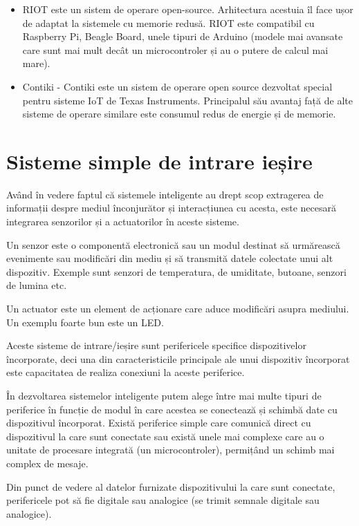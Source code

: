 \begin{itemize}
	\item RIOT este un sistem de operare open-source. Arhitectura acestuia îl face ușor de
		adaptat la sistemele cu memorie redusă. RIOT este compatibil cu
		Raspberry Pi, Beagle Board, unele tipuri de Arduino (modele mai
		avansate care sunt mai mult decât un microcontroler și au o
		putere de calcul mai mare).
	\item Contiki - Contiki este un sistem de operare open source dezvoltat
		special pentru sisteme IoT de Texas Instruments. Principalul său
		avantaj față de alte sisteme de operare similare este consumul
		redus de energie și de memorie.
\end{itemize}

\section{Sisteme simple de intrare ieșire}
\label{sec:embed:io}

Având în vedere faptul că sistemele inteligente au drept scop extragerea de
informații despre mediul înconjurător și interacțiunea cu acesta, este necesară
integrarea senzorilor și a actuatorilor în aceste sisteme.

Un senzor este o componentă electronică sau un modul destinat să urmărească
evenimente sau modificări din mediu și să transmită datele colectate unui alt
dispozitiv. Exemple sunt senzori de temperatura, de umiditate, butoane, senzori
de lumina etc.

Un actuator este un element de acționare care aduce modificări asupra mediului.
Un exemplu foarte bun este un LED.

Aceste sisteme de intrare/ieșire sunt perifericele specifice dispozitivelor
încorporate, deci una din caracteristicile principale ale unui dispozitiv
încorporat este capacitatea de realiza conexiuni la aceste periferice.

În dezvoltarea sistemelor inteligente putem alege între mai multe tipuri de
periferice în funcție de modul în care acestea se conectează și schimbă date cu
dispozitivul încorporat. Există periferice simple care comunică direct cu
dispozitivul la care sunt conectate sau există unele mai complexe care au o
unitate de procesare integrată (un microcontroler), permițând un schimb mai
complex de mesaje.

Din punct de vedere al datelor furnizate dispozitivului la care sunt conectate,
perifericele pot să fie digitale sau analogice (se trimit semnale digitale sau
analogice).

